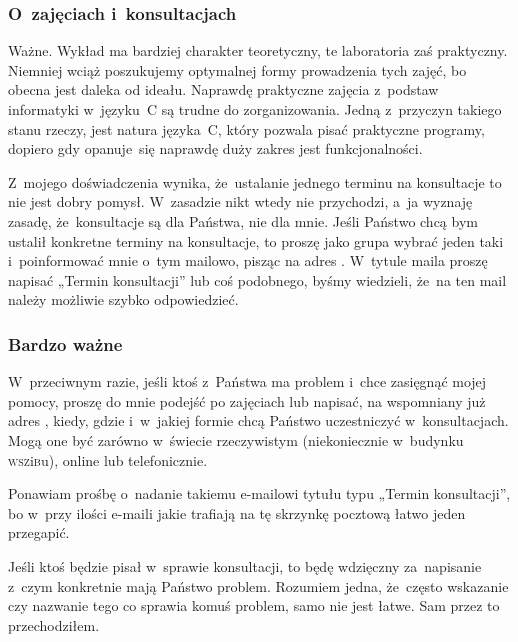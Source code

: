 \documentclass[10pt,t]{beamer}
\begin{document}
\begin{frame}
  \frametitle{O~zajęciach i~konsultacjach}


  \alert{Ważne.} Wykład ma bardziej charakter teoretyczny, te laboratoria
  zaś praktyczny. Niemniej wciąż poszukujemy optymalnej formy prowadzenia
  tych zajęć, bo obecna jest daleka od ideału. Naprawdę
  praktyczne zajęcia z~podstaw informatyki w~języku~C są trudne do
  zorganizowania. Jedną z~przyczyn takiego stanu rzeczy, jest natura
  języka~C, który pozwala pisać praktyczne programy, dopiero gdy opanuje~się
  naprawdę duży zakres jest funkcjonalności.

  Z~mojego doświadczenia wynika, że~ustalanie jednego terminu na konsultacje
  to nie jest dobry pomysł. W~zasadzie nikt wtedy nie przychodzi, a~ja
  wyznaję zasadę, że~konsultacje są dla Państwa, nie dla mnie. Jeśli
  Państwo chcą bym ustalił konkretne terminy na konsultacje, to proszę jako
  grupa wybrać jeden taki i~poinformować mnie o~tym mailowo, pisząc na
  adres \email. W~tytule maila proszę napisać „Termin konsultacji” lub
  coś podobnego, byśmy wiedzieli, że~na ten mail należy możliwie szybko
  odpowiedzieć.

\end{frame}





\begin{frame}
  \frametitle{Bardzo ważne}


  W~przeciwnym razie, jeśli ktoś z~Państwa ma problem i~chce zasięgnąć
  mojej pomocy, proszę do mnie podejść po zajęciach lub napisać, na
  wspomniany już adres \email, kiedy, gdzie i~w~jakiej formie chcą Państwo
  uczestniczyć w~konsultacjach. Mogą one być zarówno w~świecie rzeczywistym
  (niekoniecznie w~budynku \textsc{wsz}i\textsc{b}u), online lub
  telefonicznie.

  Ponawiam prośbę o~nadanie takiemu e-mailowi tytułu typu „Termin
  konsultacji”, bo w~przy ilości e-maili jakie trafiają na tę skrzynkę
  pocztową łatwo jeden przegapić.

  Jeśli ktoś będzie pisał w~sprawie konsultacji, to będę wdzięczny
  za~napisanie z~czym konkretnie mają Państwo problem. Rozumiem jedna,
  że~często wskazanie czy nazwanie tego co sprawia komuś problem, samo nie
  jest łatwe. Sam przez to przechodziłem.

\end{frame}
\end{document}
